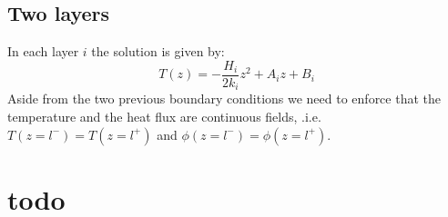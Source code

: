 \documentclass[a4paper]{article}
\begin{document}
\subsection{Two layers}

In each layer $i$ the solution is given by:
\begin{equation}
T(z)=-\frac{H_i}{2k_i} z^2 + A_iz +B_i \label{eq:gs2}
\end{equation}
Aside from the two previous boundary conditions we need to enforce that the temperature and the heat flux 
are continuous fields, .i.e. $T(z=l^-)=T(z=l^+)$ and $\phi(z=l^-)=\phi(z=l^+)$.

\newpage
\section{todo}
\end{document}
